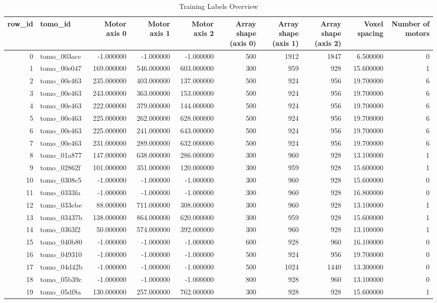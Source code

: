 \begin{table}
\caption{Training Labels Overview}
\label{tab:train_labels}
\begin{tabular}{rlrrrrrrrr}
\toprule
row\_id & tomo\_id & Motor axis 0 & Motor axis 1 & Motor axis 2 & Array shape (axis 0) & Array shape (axis 1) & Array shape (axis 2) & Voxel spacing & Number of motors \\
\midrule
0 & tomo\_003acc & -1.000000 & -1.000000 & -1.000000 & 500 & 1912 & 1847 & 6.500000 & 0 \\
1 & tomo\_00e047 & 169.000000 & 546.000000 & 603.000000 & 300 & 959 & 928 & 15.600000 & 1 \\
2 & tomo\_00e463 & 235.000000 & 403.000000 & 137.000000 & 500 & 924 & 956 & 19.700000 & 6 \\
3 & tomo\_00e463 & 243.000000 & 363.000000 & 153.000000 & 500 & 924 & 956 & 19.700000 & 6 \\
4 & tomo\_00e463 & 222.000000 & 379.000000 & 144.000000 & 500 & 924 & 956 & 19.700000 & 6 \\
5 & tomo\_00e463 & 225.000000 & 262.000000 & 628.000000 & 500 & 924 & 956 & 19.700000 & 6 \\
6 & tomo\_00e463 & 225.000000 & 241.000000 & 643.000000 & 500 & 924 & 956 & 19.700000 & 6 \\
7 & tomo\_00e463 & 231.000000 & 289.000000 & 632.000000 & 500 & 924 & 956 & 19.700000 & 6 \\
8 & tomo\_01a877 & 147.000000 & 638.000000 & 286.000000 & 300 & 960 & 928 & 13.100000 & 1 \\
9 & tomo\_02862f & 101.000000 & 351.000000 & 120.000000 & 300 & 959 & 928 & 15.600000 & 1 \\
10 & tomo\_0308c5 & -1.000000 & -1.000000 & -1.000000 & 300 & 960 & 928 & 15.600000 & 0 \\
11 & tomo\_0333fa & -1.000000 & -1.000000 & -1.000000 & 300 & 960 & 928 & 16.800000 & 0 \\
12 & tomo\_033ebe & 88.000000 & 711.000000 & 308.000000 & 300 & 960 & 928 & 13.100000 & 1 \\
13 & tomo\_03437b & 138.000000 & 864.000000 & 620.000000 & 300 & 959 & 928 & 15.600000 & 1 \\
14 & tomo\_0363f2 & 50.000000 & 574.000000 & 392.000000 & 300 & 960 & 928 & 13.100000 & 1 \\
15 & tomo\_040b80 & -1.000000 & -1.000000 & -1.000000 & 600 & 928 & 960 & 16.100000 & 0 \\
16 & tomo\_049310 & -1.000000 & -1.000000 & -1.000000 & 500 & 924 & 956 & 19.700000 & 0 \\
17 & tomo\_04d42b & -1.000000 & -1.000000 & -1.000000 & 500 & 1024 & 1440 & 13.300000 & 0 \\
18 & tomo\_05b39c & -1.000000 & -1.000000 & -1.000000 & 800 & 928 & 960 & 13.100000 & 0 \\
19 & tomo\_05df8a & 130.000000 & 257.000000 & 762.000000 & 300 & 928 & 928 & 15.600000 & 1 \\
\bottomrule
\end{tabular}
\end{table}

